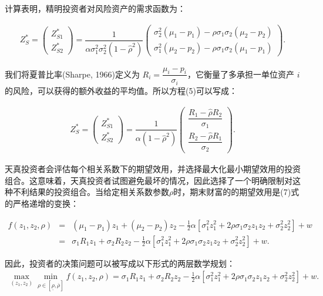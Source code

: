 \documentclass[10.0pt]{article}
\begin{document}
计算表明，精明投资者对风险资产的需求函数为：

\begin{eqnarray}
Z_S^* = \left( \begin{matrix} Z_{S 1}^* \\ Z_{S 2}^* \end{matrix} \right) 
= \dfrac1{\alpha \sigma_1^2 \sigma_2^2 (1 - {\hat \rho}^2)} \left( \begin{matrix} \sigma_2^2 (\mu_1 - p_1) - {\hat \rho} \sigma_1 \sigma_2 (\mu_2 - p_2) \\ \sigma_1^2 (\mu_2 - p_2) - {\hat \rho} \sigma_1 \sigma_2 (\mu_1 - p_1) \end{matrix} \right).
\end{eqnarray}


我们将夏普比率(Sharpe, 1966)定义为 $ R_i = \dfrac{\mu_i - p_i}{\sigma_i} $，它衡量了多承担一单位资产 $ i $ 的风险，可以获得的额外收益的平均值。所以方程(5)可以写成：

\begin{eqnarray}
Z_S^* = \left( \begin{matrix} Z_{S 1}^* \\ Z_{S 2}^* \end{matrix} \right) = \dfrac1{\alpha (1 - {\hat \rho}^2)} \left( \begin{matrix} \dfrac{R_1 - {\hat \rho} R_2}{\sigma_1} \\ \dfrac{R_2 - {\hat \rho} R_1}{\sigma_2} \end{matrix} \right).
\end{eqnarray}



天真投资者会评估每个相关系数下的期望效用，并选择最大化最小期望效用的投资组合。这意味着，天真投资者试图避免最坏的情况，因此选择了一个明确限制对这种不利结果的投资组合。当给定相关系数参数$ \rho $时，期末财富的的期望效用是(7)式的严格递增的变换：

\begin{eqnarray}
f (z_1, z_2, \rho) & = & (\mu_1 - p_1) z_1 + (\mu_2 - p_2) z_2 - \frac12 \alpha \left[ \sigma_1^2 z_1^2 + 2 \rho \sigma_1 \sigma_2 z_1 z_2 + \sigma_2^2 z_2^2 \right] + w \nonumber \\
& = & \sigma_1 R_1 z_1 + \sigma_2 R_2 z_2 - \frac12 \alpha \left[ \sigma_1^2 z_1^2 + 2 \rho \sigma_1 \sigma_2 z_1 z_2 + \sigma_2^2 z_2^2 \right] + w.
\end{eqnarray}

因此，投资者的决策问题可以被写成以下形式的两层数学规划：
\begin{eqnarray}
\max_{(z_1, z_2)} \min_{\rho \in [\underline{\rho}, \overline{\rho}]} f (z_1, z_2, \rho) = \sigma_1 R_1 z_1 + \sigma_2 R_2 z_2 - \frac12 \alpha \left[ \sigma_1^2 z_1^2 + 2 \rho \sigma_1 \sigma_2 z_1 z_2 + \sigma_2^2 z_2^2 \right] + w.
\end{eqnarray}
\end{document}
